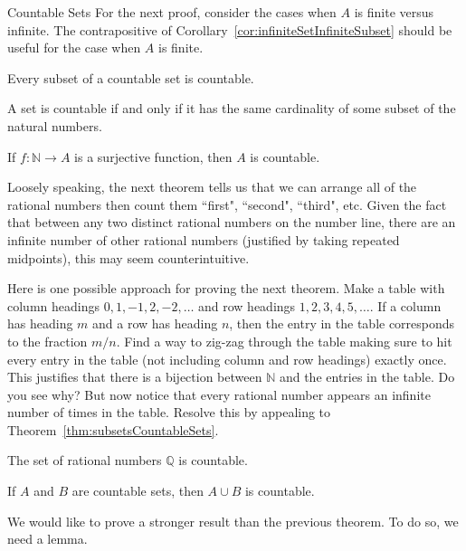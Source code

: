 \begin{section}{Countable Sets}
For the next proof, consider the cases when $A$ is finite versus infinite. The contrapositive of Corollary~\ref{cor:infiniteSetInfiniteSubset} should be useful for the case when $A$ is finite.

\begin{theorem}\label{thm:subsetsCountableSets}
Every subset of a countable set is countable.
\end{theorem}

\begin{theorem}
A set is countable if and only if it has the same cardinality of some subset of the natural numbers.
\end{theorem}

\begin{theorem}
If $f:\mathbb{N}\to A$ is a surjective function, then $A$ is countable.
\end{theorem}

Loosely speaking, the next theorem tells us that we can arrange all of the rational numbers then count them ``first", ``second", ``third", etc. Given the fact that between any two distinct rational numbers on the number line, there are an infinite number of other rational numbers (justified by taking repeated midpoints), this may seem counterintuitive.  

Here is one possible approach for proving the next theorem. Make a table with column headings $0, 1, -1, 2,-2,\ldots$ and row headings $1,2,3,4,5,\ldots$.  If a column has heading $m$ and a row has heading $n$, then the entry in the table corresponds to the fraction $m/n$.  Find a way to zig-zag through the table making sure to hit every entry in the table (not including column and row headings) exactly once.  This justifies that there is a bijection between $\mathbb{N}$ and the entries in the table.  Do you see why?  But now notice that every rational number appears an infinite number of times in the table. Resolve this by appealing to Theorem~\ref{thm:subsetsCountableSets}.

\begin{theorem}
The set of rational numbers $\mathbb{Q}$ is countable.
\end{theorem}

\begin{theorem}\label{thm:union of countable sets}
If $A$ and $B$ are countable sets, then $A\cup B$ is countable.
\end{theorem}

We would like to prove a stronger result than the previous theorem. To do so, we need a lemma. 


\end{section}
